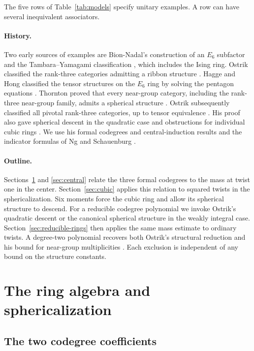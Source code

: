 \documentclass[11pt,a4paper]{article}
\theoremstyle{definition}
\theoremstyle{remark}
\numberwithin{equation}{section}
\begin{document}
The five rows of Table~\ref{tab:models} specify unitary examples.
A row can have several inequivalent associators.

\paragraph{History.}
Two early sources of examples are Bion-Nadal's construction of an
$E_6$ subfactor \cite{BN} and the Tambara--Yamagami classification
\cite{TY}, which includes the Ising ring. Ostrik classified the
rank-three categories admitting a ribbon structure \cite{OstrikRibbon}.
Hagge and Hong classified the tensor structures on the $E_6$ ring
by solving the pentagon equations \cite{HH}. Thornton proved that
every near-group category, including the rank-three near-group
family, admits a spherical structure \cite[Theorem~1.3]{Thornton}.
Ostrik subsequently classified all pivotal rank-three categories,
up to tensor equivalence \cite[Theorem~1.1]{Ostrik}. His proof
also gave spherical descent in the quadratic case and obstructions for
individual cubic rings \cite[Section~5]{Ostrik}. We use his formal
codegrees and central-induction results \cite{OstrikCodegrees,Ostrik}
and the indicator formulas of Ng and Schauenburg \cite{NSind,NSexp}.

\paragraph{Outline.}
Sections~\ref{sec:rings} and \ref{sec:central} relate the three
formal codegrees to the mass at twist one in the center.
Section~\ref{sec:cubic} applies this relation to squared twists
in the sphericalization. Six moments force the cubic
ring and allow its spherical structure to descend. For a reducible
codegree polynomial we invoke Ostrik's quadratic descent or the
canonical spherical structure in the weakly integral case.
Section~\ref{sec:reducible-rings} then applies the same mass estimate
to ordinary twists. A degree-two polynomial recovers both Ostrik's
structural reduction and his bound for near-group multiplicities
\cite[Theorems~3.3 and~4.1]{Ostrik}. Each exclusion is independent
of any bound on the structure constants.

\section{The ring algebra and sphericalization}\label{sec:rings}


\subsection{The two codegree coefficients}
\end{document}

